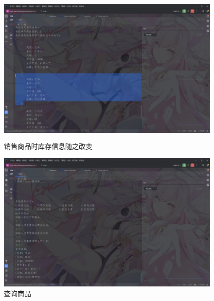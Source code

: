 \documentclass[12pt, a4paper, oneside]{ctexart}
\begin{document}
\begin{figure}[H]
    \begin{minipage}[t]{0.48\textwidth}
        \includegraphics[width=\textwidth]{../images/销售商品时库存信息随之改变.png}
        \caption{销售商品时库存信息随之改变}
    \end{minipage}
    \hfill
    \begin{minipage}[t]{0.48\textwidth}
        \includegraphics[width=\textwidth]{../images/查询商品.png}
        \caption{查询商品}
    \end{minipage}
\end{figure}
\end{document}
